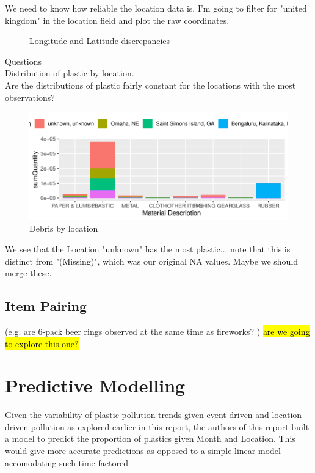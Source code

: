 \documentclass[10pt]{article}\usepackage[]{graphicx}\usepackage[]{color}
\newenvironment{knitrout}{}{} %
\begin{document}
We need to know how reliable the location data is. I'm going to filter for "united kingdom" in the location field and plot the raw coordinates.\\

\begin{figure}[H] %
\begin{center}

\caption {Longitude and Latitude discrepancies}
\label{figJ}
\end {center}
\end {figure}


Questions\\
Distribution of plastic by location.\\
Are the distributions of plastic fairly constant for the locations with the most observations?\\
\begin{figure}[H] %
\begin{center}
\begin{knitrout}\small
{}\color{fgcolor}
\includegraphics[width=1\linewidth]{figure/unnamed-chunk-18-1} 

\end{knitrout}
\caption {Debris by location}
\label{figG}
\end {center}
\end {figure}
We see that the Location "unknown" has the most plastic... note that this is distinct from "(Missing)", which was our original NA values. Maybe we should merge these.



\subsection{Item Pairing} 
(e.g. are 6-pack beer rings observed at the same time as fireworks? )
\hl{are we going to explore this one?}

\pagebreak
\section{Predictive Modelling}
Given the variability of plastic pollution trends given event-driven and location-driven pollution as explored earlier in this report, the authors of this report built a model to predict the proportion of plastics given Month and Location. This would give more accurate predictions as opposed to a simple linear model accomodating such time factored
\end{document}
